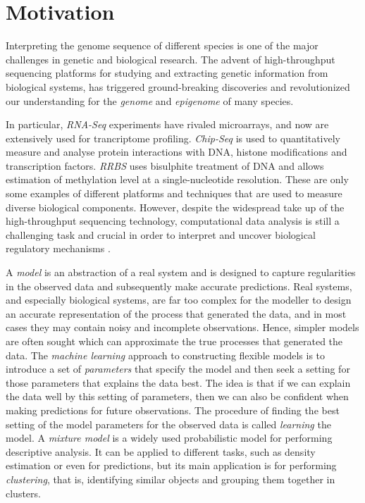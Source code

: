 \section{Motivation} \label{motivation-intro-l}
Interpreting the genome sequence of different species is one of the major challenges in genetic and biological research. The advent of high-throughput sequencing platforms for studying and extracting genetic information from biological systems, has triggered ground-breaking discoveries and revolutionized our understanding for the \emph{genome} and \emph{epigenome} of many species. 

In particular, \emph{RNA-Seq} experiments \citep{Marioni2008} have rivaled microarrays, and now are extensively used for trancriptome profiling. \emph{Chip-Seq} \citep{Park2009} is used to quantitatively measure and analyse protein interactions with DNA, \ie histone modifications and transcription factors. \emph{RRBS} \citep{Meissner2005} uses bisulphite treatment of DNA and allows estimation of methylation level at a single-nucleotide resolution. These are only some examples of different platforms and techniques that are used to measure diverse biological components. However, despite the widespread take up of the high-throughput sequencing technology, computational data analysis is still a challenging task and crucial in order to interpret and uncover biological regulatory mechanisms \citep{Park2009}.

A \emph{model} is an abstraction of a real system and is designed to capture regularities in the observed data and subsequently make accurate predictions. Real systems, and especially biological systems, are far too complex for the modeller to design an accurate representation of the process that generated the data, and in most cases they may contain noisy and incomplete observations. Hence, simpler models are often sought which can approximate the true processes that generated the data. The \emph{machine learning} approach to constructing flexible models is to introduce a set of \emph{parameters} that specify the model and then seek a setting for those parameters that explains the data best. The idea is that if we can explain the data well by this setting of parameters, then we can also be confident when making predictions for future observations. The procedure of finding the best setting of the model parameters for the observed data is called \emph{learning} the model. A \emph{mixture model} is a widely used probabilistic model for performing descriptive analysis. It can be applied to different tasks, such as density estimation or even for predictions, but its main application is for performing \emph{clustering}, that is, identifying similar objects and grouping them together in clusters. 

